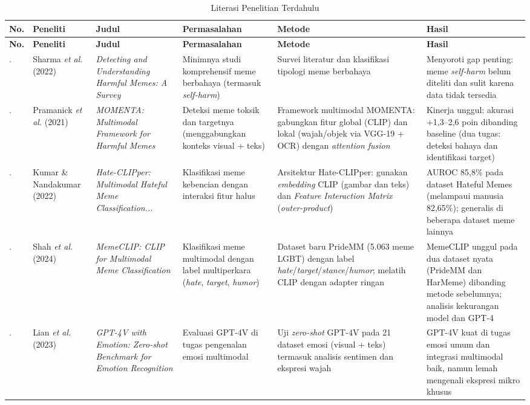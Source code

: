 \begin{landscape}
\begin{longtable}{|>{\centering\arraybackslash}p{0.8cm}|p{3cm}|p{4.2cm}|p{4cm}|p{3.5cm}|p{4.5cm}|}
	\caption{Literasi Penelitian Terdahulu}
	\label{table:2.literasi}\\
	\hline
	\textbf{No.} & \textbf{Peneliti} & \textbf{Judul} & \textbf{Permasalahan} & \textbf{Metode} & \textbf{Hasil} \\
	\hline
	\endfirsthead
	\hline
	\textbf{No.} & \textbf{Peneliti} & \textbf{Judul} & \textbf{Permasalahan} & \textbf{Metode} & \textbf{Hasil} \\
	\hline
	\endhead
	1. & Sharma \textit{et al.} (2022) \cite{Sharma2022HarmfulMemes} & \textit{Detecting and Understanding Harmful Memes: A Survey} & Minimnya studi komprehensif meme berbahaya (termasuk \textit{self-harm}) & Survei literatur dan klasifikasi tipologi meme berbahaya & Menyoroti gap penting: meme \textit{self-harm} belum diteliti dan sulit karena data tidak tersedia\\ 
	\hline
	2. & Pramanick \textit{et al.} (2021) \cite{pramanick2021momenta} & \textit{MOMENTA: Multimodal Framework for Harmful Memes} & Deteksi meme toksik dan targetnya (menggabungkan konteks visual + teks) & Framework multimodal MOMENTA: gabungkan fitur global (CLIP) dan lokal (wajah/objek via VGG-19 + OCR) dengan \textit{attention fusion} & Kinerja unggul: akurasi +1,3--2,6 poin dibanding baseline (dua tugas: deteksi bahaya dan identifikasi target)\\ 
	\hline
	3. & Kumar \& Nandakumar (2022) \cite{kumar2022hateclipper} & \textit{Hate-CLIPper: Multimodal Hateful Meme Classification...} & Klasifikasi meme kebencian dengan interaksi fitur halus & Arsitektur Hate-CLIPper: gunakan \textit{embedding} CLIP (gambar dan teks) dan \textit{Feature Interaction Matrix} (\textit{outer-product}) & AUROC 85,8\% pada dataset Hateful Memes (melampaui manusia 82,65\%); generalis di beberapa dataset meme lainnya\\ 
	\hline
	4. & Shah \textit{et al.} (2024) \cite{shah2024memeclip} & \textit{MemeCLIP: CLIP for Multimodal Meme Classification} & Klasifikasi meme multimodal dengan label multiperkara (\textit{hate}, \textit{target}, \textit{humor}) & Dataset baru PrideMM (5.063 meme LGBT) dengan label \textit{hate}/\textit{target}/\textit{stance}/\textit{humor}; melatih CLIP dengan adapter ringan & MemeCLIP unggul pada dua dataset nyata (PrideMM dan HarMeme) dibanding metode sebelumnya; analisis kekurangan model dan GPT-4\\ 
	\hline
	5. & Lian \textit{et al.} (2023) \cite{lian2023gpt4v} & \textit{GPT-4V with Emotion: Zero-shot Benchmark for Emotion Recognition} & Evaluasi GPT-4V di tugas pengenalan emosi multimodal & Uji \textit{zero-shot} GPT-4V pada 21 dataset emosi (visual + teks) termasuk analisis sentimen dan ekspresi wajah & GPT-4V kuat di tugas emosi umum dan integrasi multimodal baik, namun lemah mengenali ekspresi mikro khusus\\ 
	\hline
\end{longtable}
\end{landscape}




